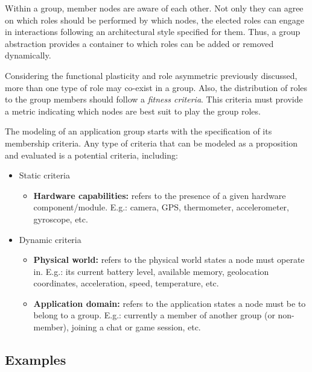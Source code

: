 Within a group, member nodes are aware of each other. Not only they can agree on which roles should be performed by which nodes, the elected roles can engage in interactions following an architectural style specified for them. Thus, a group abstraction provides a container to which roles can be added or removed dynamically. 

Considering the functional plasticity and role asymmetric previously discussed, more than one type of role may co-exist in a group. Also, the distribution of roles to the group members should follow a \textit{fitness criteria}. This criteria must provide a metric indicating which nodes are best suit to play the group roles.


The modeling of an application group starts with the specification of its membership criteria. Any type of criteria that can be modeled as a proposition and evaluated is a potential criteria, including:

\begin{itemize}
	
	\item Static criteria
	
	\begin{itemize}
		\item \textbf{Hardware capabilities:} refers to the presence of a given hardware component/module. E.g.: camera, GPS, thermometer, accelerometer, gyroscope, etc.
	\end{itemize}
	
	\item Dynamic criteria
	
	\begin{itemize}
		\item \textbf{Physical world:} refers to the physical world states a node must operate in. E.g.: its current battery level, available memory, geolocation coordinates, acceleration, speed, temperature, etc.
		
		\item \textbf{Application domain:} refers to the application states a node must be to belong to a group. E.g.: currently a member of another group (or non-member), joining a chat or game session, etc.
	\end{itemize}
\end{itemize}

\subsection{Examples}

